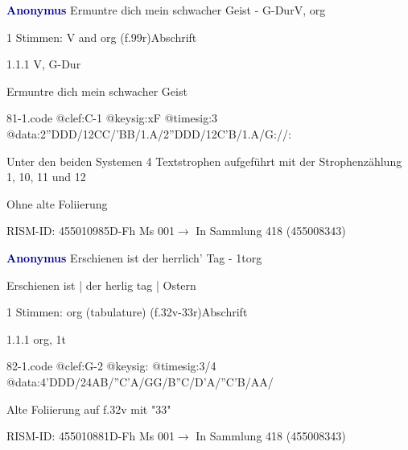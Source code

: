 \documentclass[twocolumn, 12pt]{book}
\begin{document}
\par \vspace{16pt} \textcolor{darkblue}{\textbf{Anonymus  }}\hfillplus{\textbf{[81]}}\newline Ermuntre dich mein schwacher Geist - G-Dur\newline V, org
\par \begin{itshape}\end{itshape} 
\par \textcolor{darkblue}{}  1 Stimmen: V and org  (f.99r)\newline Abschrift
\par 1.1.1  V, G-Dur\newline \begin{footnotesize} Ermuntre dich mein schwacher Geist \end{footnotesize}  
\begin{filecontents*}{81-1.code}
@clef:C-1
@keysig:xF
@timesig:3
@data:2''DDD/12CC/'BB/1.A/2''DDD/12C'B/1.A/G://:
\end{filecontents*}
\newline %
\par Unter den beiden Systemen 4 Textstrophen aufgeführt mit der Strophenzählung 1, 10, 11 und 12
\par Ohne alte Foliierung
\par RISM-ID: 455010985\newline D-Fh  Ms 001\newline $\rightarrow$ In Sammlung 418 (455008343)
      
\par \vspace{16pt} \textcolor{darkblue}{\textbf{Anonymus  }}\hfillplus{\textbf{[82]}}\newline Erschienen ist der herrlich' Tag - 1t\newline org
\par \begin{itshape}[f.32v, at left:] Erschienen ist | der herlig tag | Ostern\end{itshape} 
\par \textcolor{darkblue}{}  1 Stimmen: org (tabulature)  (f.32v-33r)\newline Abschrift
\par 1.1.1  org, 1t  
\begin{filecontents*}{82-1.code}
@clef:G-2
@keysig:
@timesig:3/4
@data:4'DDD/24AB/''C'A/GG/B''C/D'A/''C'B/AA/
\end{filecontents*}
\newline %
\par Alte Foliierung auf f.32v mit "33"
\par RISM-ID: 455010881\newline D-Fh  Ms 001\newline $\rightarrow$ In Sammlung 418 (455008343)
      
\end{document}
